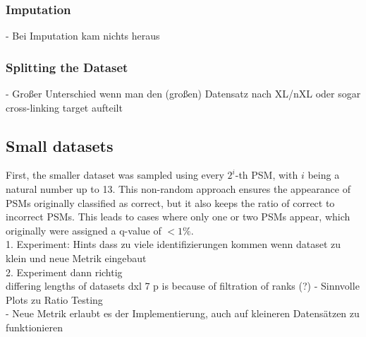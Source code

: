 \subsubsection{Imputation}
\label{lab:results:imputation}
- Bei Imputation kam nichts heraus\\
\subsubsection{Splitting the Dataset}
\label{lab:results:splitting}
- Großer Unterschied wenn man den (großen) Datensatz nach XL/nXL oder sogar cross-linking target aufteilt\\

\subsection{Small datasets}
First, the smaller dataset was sampled using every $2^i$-th PSM, with $i$ being a natural number up to 13. This non-random approach ensures the appearance of PSMs originally classified as correct, but it also keeps the ratio of correct to incorrect PSMs. This leads to cases where only one or two PSMs appear, which originally were assigned a q-value of $<1\%$. \\
1. Experiment: Hints dass zu viele identifizierungen kommen wenn dataset zu klein und neue Metrik eingebaut\\
2. Experiment dann richtig\\
differing lengths of datasets dxl 7 p is because of filtration of ranks (?)
- Sinnvolle Plots zu Ratio Testing\\
- Neue Metrik erlaubt es der Implementierung, auch auf kleineren Datensätzen zu funktionieren